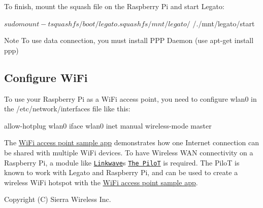 To finish, mount the squash file on the Raspberry Pi and start Legato\+: 
\begin{DoxyCode}
$ sudo mount -t squashfs /boot/legato.squashfs /mnt/legato/
$ /./mnt/legato/start
\end{DoxyCode}


\begin{DoxyNote}{Note}
To use data connection, you must install P\+PP Daemon (use \textquotesingle{}apt-\/get install ppp\textquotesingle{})
\end{DoxyNote}
\hypertarget{raspbianMain_raspbianMain_configWifi}{}\subsection{Configure Wi\+Fi}\label{raspbianMain_raspbianMain_configWifi}
To use your Raspberry Pi as a Wi\+Fi access point, you need to configure {\ttfamily wlan0} in the {\ttfamily /etc/network/interfaces} file like this\+:


\begin{DoxyCode}
allow-hotplug wlan0
iface wlan0 inet manual
    wireless-mode master
\end{DoxyCode}


The \hyperlink{wifi_wifiap_testapp}{Wi\+Fi access point sample app} demonstrates how one Internet connection can be shared with multiple Wi\+Fi devices. To have Wireless W\+AN connectivity on a Raspberry Pi, a module like \href{http://linkwave.co.uk/}{\tt Linkwave}\textquotesingle{}s \href{http://linkwave.co.uk/the-pilot}{\tt The PiloT} is required. The PiloT is known to work with Legato and Raspberry Pi, and can be used to create a wireless Wi\+Fi hotspot with the \hyperlink{wifi_wifiap_testapp}{Wi\+Fi access point sample app}.

Copyright (C) Sierra Wireless Inc. 